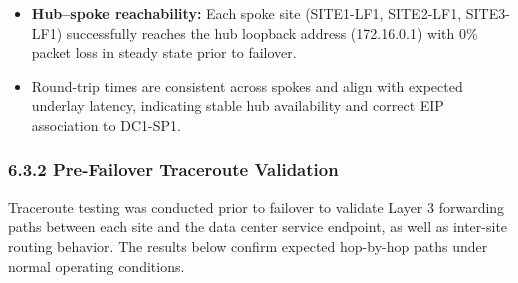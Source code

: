 \documentclass[11pt]{article}
\begin{document}
\begin{itemize}
  \item \textbf{Hub--spoke reachability:}
        Each spoke site (SITE1-LF1, SITE2-LF1, SITE3-LF1) successfully reaches the hub loopback
        address (172.16.0.1) with 0\% packet loss in steady state prior to failover.
  \item Round-trip times are consistent across spokes and align with expected underlay latency,
        indicating stable hub availability and correct EIP association to DC1-SP1.
\end{itemize}

%
%
%
\subsubsection{6.3.2 Pre-Failover Traceroute Validation}
\label{sec:pre-failover-traceroute}

Traceroute testing was conducted prior to failover to validate Layer 3 forwarding paths between each site and the data center service endpoint, as well as inter-site routing behavior. The results below confirm expected hop-by-hop paths under normal operating conditions.
\end{document}
